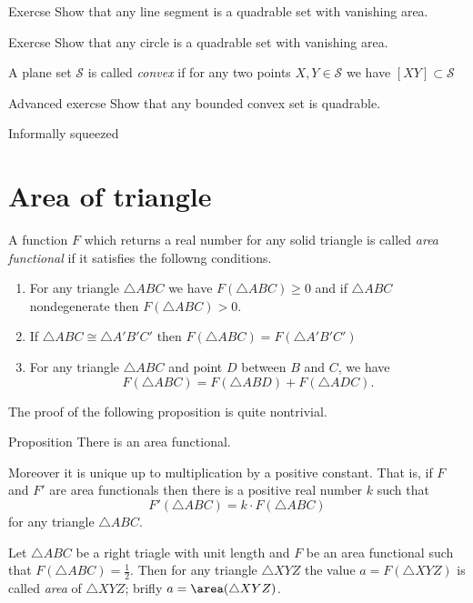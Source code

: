{\begin{thm}{Exercse}
Show that any line segment is a quadrable set with vanishing area.
\end{thm}

\begin{thm}{Exercse}
Show that any circle is a quadrable set with vanishing area.
\end{thm}

A plane set $\mathcal{S}$
is called \emph{convex} if for any two points $X,Y\in \mathcal{S}$
we have $[XY]\subset \mathcal{S}$

\begin{thm}{Advanced exercse}
Show that any bounded convex set is quadrable.
\end{thm}



Informally squeezed


\section*{Area of triangle}


A function $F$ which returns a real number 
for any solid triangle is called \emph{area functional} if it satisfies the followng conditions.

\begin{enumerate}
\item For any triangle $\triangle ABC$ we have $F(\triangle ABC)\ge 0$ and 
if  $\triangle ABC$ nondegenerate then $F(\triangle ABC)>0$.
\item If $\triangle ABC\cong\triangle A'B'C'$ 
 then $F(\triangle ABC)=F(\triangle A'B'C')$
\item For any triangle $ \triangle ABC$ and point $D$ between $B$ and $C$, we have
$$F(\triangle ABC)=F(\triangle ABD)+F(\triangle ADC).$$
\end{enumerate}

The proof of the following proposition is quite nontrivial.

\begin{thm}{Proposition}
There is an area functional. 

Moreover it is unique up to multiplication by a positive constant. 
That is, if $F$ and $F'$ are area functionals then there is a positive real number $k$ such that 
\[F'(\triangle ABC)=k\cdot F(\triangle ABC)\]
for any triangle $\triangle ABC$.
\end{thm}

Let $\triangle ABC$ be a right triagle with unit length
and $F$ be an area functional such that $F(\triangle ABC)=\tfrac12$.
Then for any triangle $\triangle XYZ$ the value $a=F(\triangle XYZ)$ is called \emph{area} of $\triangle XYZ$;
brifly $a=\area(\triangle XYZ)$.















}
